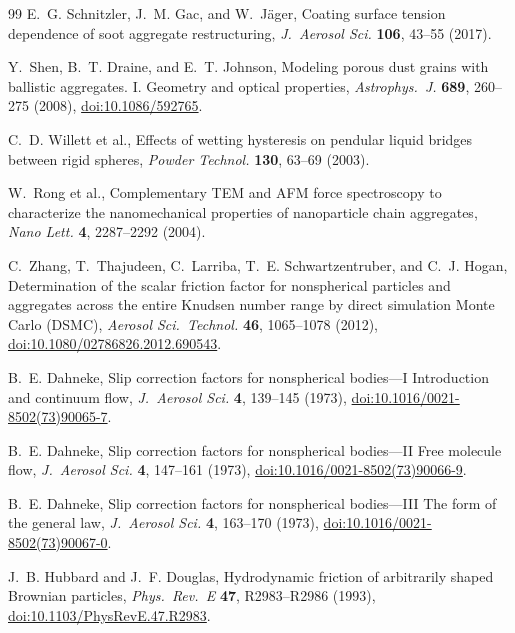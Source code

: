 \documentclass[11pt,a4paper]{article}
\begin{document}
\begin{thebibliography}{99}
E.~G. Schnitzler, J.~M. Gac, and W.~J\"ager,
Coating surface tension dependence of soot aggregate restructuring,
\emph{J.\ Aerosol Sci.} \textbf{106}, 43--55 (2017).

Y.~Shen, B.~T. Draine, and E.~T. Johnson,
Modeling porous dust grains with ballistic aggregates. I. Geometry and optical properties,
\emph{Astrophys.\ J.} \textbf{689}, 260--275 (2008),
\href{https://doi.org/10.1086/592765}{doi:10.1086/592765}.

C.~D. Willett et al.,
Effects of wetting hysteresis on pendular liquid bridges between rigid spheres,
\emph{Powder Technol.} \textbf{130}, 63--69 (2003).

W.~Rong et al.,
Complementary TEM and AFM force spectroscopy to characterize the nanomechanical properties of nanoparticle chain aggregates,
\emph{Nano Lett.} \textbf{4}, 2287--2292 (2004).

C.~Zhang, T.~Thajudeen, C.~Larriba, T.~E. Schwartzentruber, and C.~J. Hogan,
Determination of the scalar friction factor for nonspherical particles and aggregates across the entire Knudsen number range by direct simulation Monte Carlo (DSMC),
\emph{Aerosol Sci.\ Technol.} \textbf{46}, 1065--1078 (2012),
\href{https://doi.org/10.1080/02786826.2012.690543}{doi:10.1080/02786826.2012.690543}.

B.~E. Dahneke,
Slip correction factors for nonspherical bodies---I Introduction and continuum flow,
\emph{J.\ Aerosol Sci.} \textbf{4}, 139--145 (1973),
\href{https://doi.org/10.1016/0021-8502(73)90065-7}{doi:10.1016/0021-8502(73)90065-7}.

B.~E. Dahneke,
Slip correction factors for nonspherical bodies---II Free molecule flow,
\emph{J.\ Aerosol Sci.} \textbf{4}, 147--161 (1973),
\href{https://doi.org/10.1016/0021-8502(73)90066-9}{doi:10.1016/0021-8502(73)90066-9}.

B.~E. Dahneke,
Slip correction factors for nonspherical bodies---III The form of the general law,
\emph{J.\ Aerosol Sci.} \textbf{4}, 163--170 (1973),
\href{https://doi.org/10.1016/0021-8502(73)90067-0}{doi:10.1016/0021-8502(73)90067-0}.

J.~B. Hubbard and J.~F. Douglas,
Hydrodynamic friction of arbitrarily shaped Brownian particles,
\emph{Phys.\ Rev.\ E} \textbf{47}, R2983--R2986 (1993),
\href{https://doi.org/10.1103/PhysRevE.47.R2983}{doi:10.1103/PhysRevE.47.R2983}.


\end{thebibliography}
\end{document}
